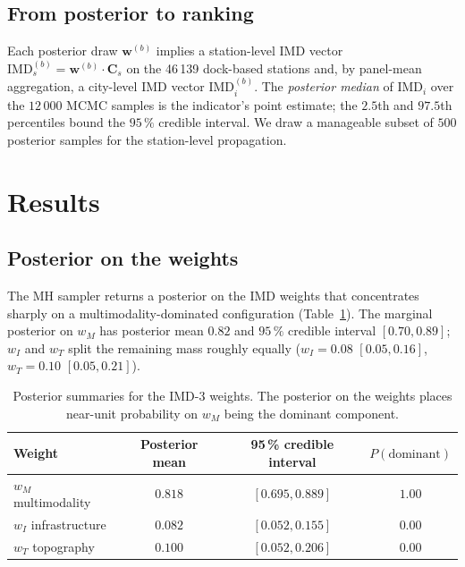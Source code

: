 \documentclass[11pt,a4paper]{article}
\newcommand{\IMD}{\mathrm{IMD}}
\begin{document}
\subsection{From posterior to ranking}

Each posterior draw $\mathbf{w}^{(b)}$ implies a station-level
IMD vector $\IMD_s^{(b)} = \mathbf{w}^{(b)} \cdot \mathbf{C}_s$
on the 46\,139 dock-based stations and, by panel-mean
aggregation, a city-level IMD vector $\IMD_i^{(b)}$. The
\emph{posterior median} of $\IMD_i$ over the $12\,000$ MCMC
samples is the indicator's point estimate; the $2.5$th and
$97.5$th percentiles bound the $95\,\%$ credible interval. We
draw a manageable subset of $500$ posterior samples for the
station-level propagation.

\section{Results}
\label{sec:results}

\subsection{Posterior on the weights}
\label{sec:results-weights}

The MH sampler returns a posterior on the IMD weights that
concentrates sharply on a multimodality-dominated configuration
(Table~\ref{tab:weights}). The marginal posterior on $w_M$ has
posterior mean $0.82$ and $95\,\%$ credible interval $[0.70,
0.89]$; $w_I$ and $w_T$ split the remaining mass roughly
equally ($w_I = 0.08$ $[0.05, 0.16]$, $w_T = 0.10$ $[0.05,
0.21]$).

\begin{table}[H]
\centering
\caption{Posterior summaries for the IMD-3 weights. The
posterior on the weights places near-unit probability on $w_M$
being the dominant component.}
\label{tab:weights}
\small
\begin{tabular}{@{}lccc@{}}
\toprule
Weight & Posterior mean & 95\,\% credible interval &
$P(\text{dominant})$\\
\midrule
$w_M$ multimodality       & $0.818$ & $[0.695, 0.889]$ & $1.00$ \\
$w_I$ infrastructure      & $0.082$ & $[0.052, 0.155]$ & $0.00$ \\
$w_T$ topography          & $0.100$ & $[0.052, 0.206]$ & $0.00$ \\
\bottomrule
\end{tabular}
\end{table}
\end{document}
